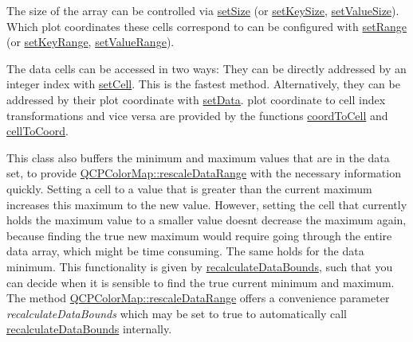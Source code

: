 The size of the array can be controlled via \hyperlink{class_q_c_p_color_map_data_a0d9ff35c299d0478b682bfbcdd9c097e}{set\+Size} (or \hyperlink{class_q_c_p_color_map_data_ac7ef70e383aface34b44dbde49234b6b}{set\+Key\+Size}, \hyperlink{class_q_c_p_color_map_data_a0893c9e3914513048b45e3429ffd16f2}{set\+Value\+Size}). Which plot coordinates these cells correspond to can be configured with \hyperlink{class_q_c_p_color_map_data_aad9c1c7c703c1339489fc730517c83d4}{set\+Range} (or \hyperlink{class_q_c_p_color_map_data_a0738c485f3c9df9ea1241b7a8bb6a86e}{set\+Key\+Range}, \hyperlink{class_q_c_p_color_map_data_ada1b2680ba96a5f4175b6d341cf75d23}{set\+Value\+Range}).

The data cells can be accessed in two ways\+: They can be directly addressed by an integer index with \hyperlink{class_q_c_p_color_map_data_a8e75eaf8746596319032a93f3d2d0683}{set\+Cell}. This is the fastest method. Alternatively, they can be addressed by their plot coordinate with \hyperlink{class_q_c_p_color_map_data_afd2083ccfd6987ec94aa7ef8e91ca39a}{set\+Data}. plot coordinate to cell index transformations and vice versa are provided by the functions \hyperlink{class_q_c_p_color_map_data_a26e33c5ec7094b60136350bcd77d3737}{coord\+To\+Cell} and \hyperlink{class_q_c_p_color_map_data_ac96d6e84befe7b9951b5da6d4d4a2a47}{cell\+To\+Coord}.

This class also buffers the minimum and maximum values that are in the data set, to provide \hyperlink{class_q_c_p_color_map_a856608fa3dd1cc290bcd5f29a5575774}{Q\+C\+P\+Color\+Map\+::rescale\+Data\+Range} with the necessary information quickly. Setting a cell to a value that is greater than the current maximum increases this maximum to the new value. However, setting the cell that currently holds the maximum value to a smaller value doesn\textquotesingle{}t decrease the maximum again, because finding the true new maximum would require going through the entire data array, which might be time consuming. The same holds for the data minimum. This functionality is given by \hyperlink{class_q_c_p_color_map_data_ab235ade8a4d64bd3adb26a99b3dd57ee}{recalculate\+Data\+Bounds}, such that you can decide when it is sensible to find the true current minimum and maximum. The method \hyperlink{class_q_c_p_color_map_a856608fa3dd1cc290bcd5f29a5575774}{Q\+C\+P\+Color\+Map\+::rescale\+Data\+Range} offers a convenience parameter {\itshape recalculate\+Data\+Bounds} which may be set to true to automatically call \hyperlink{class_q_c_p_color_map_data_ab235ade8a4d64bd3adb26a99b3dd57ee}{recalculate\+Data\+Bounds} internally. 

